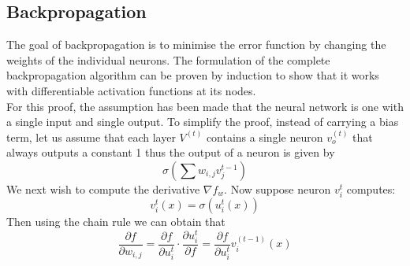 \documentclass{article}
\begin{document}
\subsection{Backpropagation}
The goal of backpropagation is to minimise the error function by changing the weights of the individual neurons. The formulation of the complete backpropagation algorithm can be proven by induction to show that it works with differentiable activation functions at its nodes.
\\
For this proof, the assumption has been made that the neural network is one with a single input and single output. To simplify the proof, instead of carrying a bias term, let us assume that each layer $V^{(t)}$ contains a single neuron $v_o^{(t)}$ that always outputs a constant 1 thus the output of a neuron is given by $$\sigma(\sum w_{i,j}v_j^{t-1})$$ We next wish to compute the derivative $\nabla f_w$. Now suppose neuron $v_i^{t}$ computes:
$$v_i^t(x) = \sigma(u_i^t(x))$$
Then using the chain rule we can obtain that\\
$$\frac{\partial f}{\partial w_{i,j}} = \frac{\partial f}{\partial u_i^t}\cdot \frac{\partial u_i^t}{\partial f} = \frac{\partial f}{\partial u_i^t}v_i^{(t-1)}(x)$$\\
\end{document}
